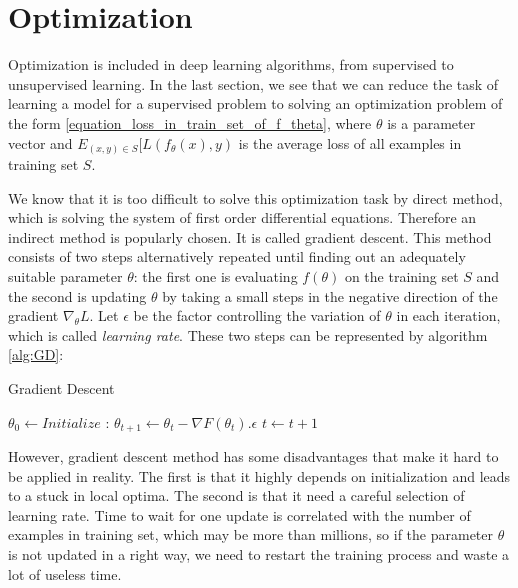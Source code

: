 \section{Optimization}
Optimization is included in deep learning algorithms, from supervised to unsupervised learning. In the last section, we see that we can reduce the task of learning a model for a supervised problem to solving an optimization problem of the form \eqref{equation_loss_in_train_set_of_f_theta}, where $\displaystyle \theta$ is a parameter vector and $\displaystyle E_{(x,y) \in S}[L(f_{\theta}(x), y)$ is the average loss of all examples in training set $\displaystyle S$. 

We know that it is too difficult to solve this optimization task by direct method, which is solving the system of first order differential equations. Therefore an indirect method is popularly chosen. It is called gradient descent. This method consists of two steps alternatively repeated until finding out an adequately suitable parameter $\displaystyle \theta$: the first one is evaluating $\displaystyle f(\theta)$ on the training set $\displaystyle S$ and the second is updating $\displaystyle \theta$ by taking a small steps in the negative direction of the gradient $\displaystyle \nabla_{\theta}L$. Let $\displaystyle \epsilon$ be the factor controlling the variation of $\displaystyle \theta$ in each iteration, which is called \textit{learning rate}. These two steps can be represented by algorithm \ref{alg:GD}:
\begin{algorithm}
    \caption{Gradient Descent} \label{alg:GD}
    \begin{algorithmic}[1]
        \State $\theta_0 \gets \textit{Initialize}$
        :
            \State $\theta_{t + 1} \gets \theta_{t} - \nabla F(\theta_{t}) . \epsilon$
            \State $t \gets t + 1$
        \EndFor
    \end{algorithmic}
\end{algorithm}

However, gradient descent method has some disadvantages that make it hard to be applied in reality. The first is that it highly depends on initialization and leads to a stuck in local optima. The second is that it need a careful selection of learning rate. Time to wait for one update is correlated with the number of examples in training set, which may be more than millions, so if the parameter $\displaystyle \theta$ is not updated in a right way, we need to restart the training process and waste a lot of useless time.

